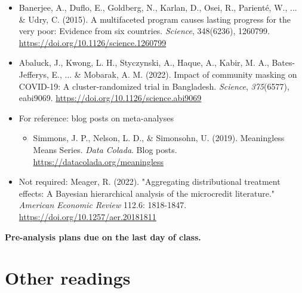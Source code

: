\documentclass[letterpaper,12pt,parskip=full,DIV=10]{scrartcl}
\begin{document}
\begin{itemize}

\item Banerjee, A., Duflo, E., Goldberg, N., Karlan, D., Osei, R., Parienté, W., ... \& Udry, C. (2015). A multifaceted program causes lasting progress for the very poor: Evidence from six countries. \emph{Science}, 348(6236), 1260799. \url{https://doi.org/10.1126/science.1260799}

\item Abaluck, J., Kwong, L. H., Styczynski, A., Haque, A., Kabir, M. A., Bates-Jefferys, E., ... \& Mobarak, A. M. (2022). Impact of community masking on COVID-19: A cluster-randomized trial in Bangladesh. \emph{Science}, \emph{375}(6577), eabi9069. \url{https://doi.org/10.1126/science.abi9069}

\item For reference: blog posts on meta-analyses

\begin{itemize}

\item Simmons, J. P., Nelson, L. D., \&  Simonsohn, U. (2019). Meaningless Means Series. \emph{Data Colada}. Blog posts. \url{https://datacolada.org/meaningless}

\end{itemize}

\item Not required: Meager, R. (2022). "Aggregating distributional treatment effects: A Bayesian hierarchical analysis of the microcredit literature." \emph{American Economic Review} 112.6: 1818-1847. \url{https://doi.org/10.1257/aer.20181811}

\end{itemize}

\textbf{Pre-analysis plans due on the last day of class.}

\section*{Other readings}
\end{document}
